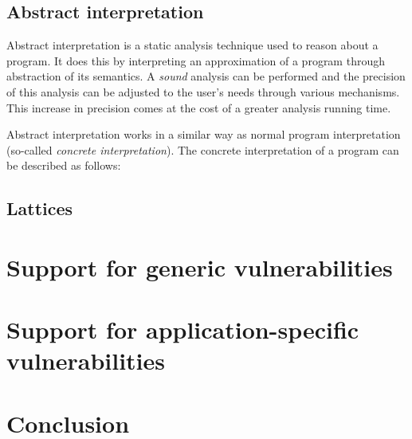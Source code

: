 \subsection{Abstract interpretation}
Abstract interpretation is a static analysis technique used to reason about a program. It does this by interpreting an approximation of a program through abstraction of its semantics. A \textit{sound} analysis can be performed and the precision of this analysis can be adjusted to the user's needs through various mechanisms. This increase in precision comes at the cost of a greater analysis running time. 

Abstract interpretation works in a similar way as normal program interpretation (so-called \textit{concrete interpretation}). The concrete interpretation of a program can be described as follows: 

\subsection{Lattices}
\section{Support for generic vulnerabilities}
\label{sec:genericVulnerabilities}
\section{Support for application-specific vulnerabilities}
\label{sec:applicationSpecificVulnerabilities}
\section{Conclusion}

